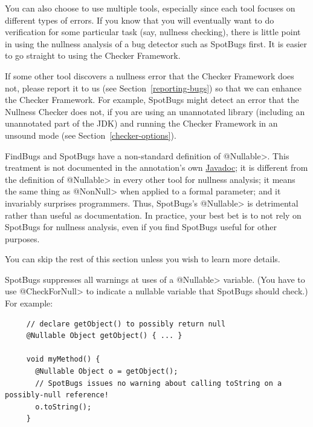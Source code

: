 You can also choose to use multiple tools, especially since each tool
focuses on different types of errors.  If you know that you will eventually
want to do verification for some particular task (say, nullness checking),
there is little point in using the nullness analysis of a bug detector such as
SpotBugs first.  It is easier to go straight to using the
Checker Framework.

If some other tool discovers a nullness error that the Checker
Framework does not, please report it to us (see
Section~\ref{reporting-bugs}) so that we can enhance the Checker Framework.
For example, SpotBugs might detect an error that the Nullness Checker does
not, if you are using an unannotated library (including an unannotated
part of the JDK) and running the Checker Framework in an unsound mode (see
Section~\ref{checker-options}).



FindBugs and SpotBugs have a non-standard definition of
\<@Nullable>.  This treatment is not documented in the annotation's own
\href{https://www.javadoc.io/doc/com.github.spotbugs/spotbugs-annotations/latest/edu/umd/cs/findbugs/annotations/Nullable.html}{Javadoc};
it is different from the definition of \<@Nullable> in every other tool for
nullness analysis; it means the same thing as \<@NonNull> when applied to a
formal parameter; and it invariably surprises programmers.  Thus, SpotBugs's
\<@Nullable> is detrimental rather than useful as documentation.
In practice, your best bet is to not rely on SpotBugs for nullness analysis,
even if you find SpotBugs useful for other purposes.

You can skip the rest of this section unless you wish to learn more details.

SpotBugs suppresses all warnings at uses of a \<@Nullable> variable.
(You have to use \<@CheckForNull> to
indicate a nullable variable that SpotBugs should check.)  For example:

\begin{Verbatim}
     // declare getObject() to possibly return null
     @Nullable Object getObject() { ... }

     void myMethod() {
       @Nullable Object o = getObject();
       // SpotBugs issues no warning about calling toString on a possibly-null reference!
       o.toString();
     }
\end{Verbatim}

